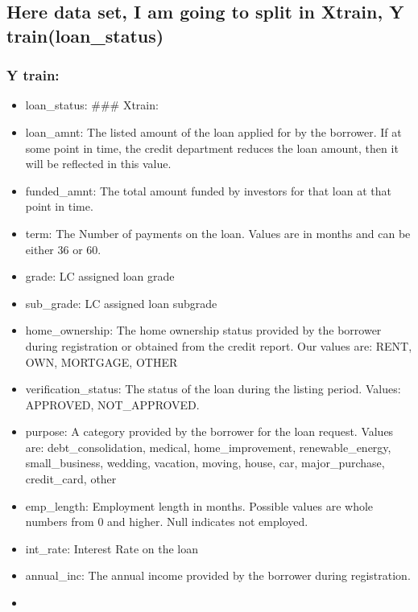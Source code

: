 \documentclass[11pt]{article}
\providecommand{\tightlist}{%
      \setlength{\itemsep}{0pt}\setlength{\parskip}{0pt}}
\begin{document}
    \hypertarget{here-data-set-i-am-going-to-split-in-xtrain-y-trainloan_status}{%
\subsection{Here data set, I am going to split in Xtrain, Y
train(loan\_status)}\label{here-data-set-i-am-going-to-split-in-xtrain-y-trainloan_status}}

\hypertarget{y-train}{%
\subsubsection{Y train:}\label{y-train}}

\begin{itemize}
\tightlist
\item
  loan\_status: \#\#\# Xtrain:
\item
  loan\_amnt: The listed amount of the loan applied for by the borrower.
  If at some point in time, the credit department reduces the loan
  amount, then it will be reflected in this value.
\item
  funded\_amnt: The total amount funded by investors for that loan at
  that point in time.
\item
  term: The Number of payments on the loan. Values are in months and can
  be either 36 or 60.
\item
  grade: LC assigned loan grade
\item
  sub\_grade: LC assigned loan subgrade
\item
  home\_ownership: The home ownership status provided by the borrower
  during registration or obtained from the credit report. Our values
  are: RENT, OWN, MORTGAGE, OTHER
\item
  verification\_status: The status of the loan during the listing
  period. Values: APPROVED, NOT\_APPROVED.
\item
  purpose: A category provided by the borrower for the loan request.
  Values are: debt\_consolidation, medical, home\_improvement,
  renewable\_energy, small\_business, wedding, vacation, moving, house,
  car, major\_purchase, credit\_card, other
\item
  emp\_length: Employment length in months. Possible values are whole
  numbers from 0 and higher. Null indicates not employed.
\item
  int\_rate: Interest Rate on the loan
\item
  annual\_inc: The annual income provided by the borrower during
  registration.
\item

\end{itemize}
\end{document}
